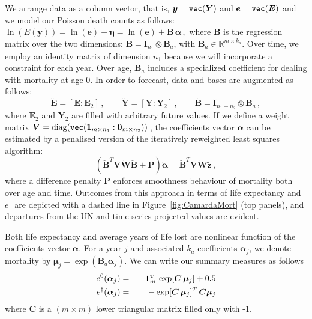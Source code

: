 \documentclass[twoside]{report}
\begin{document}
We arrange data as a column vector, that is, $\bm{y} = \verb"vec"(\bm{Y})$ and $\bm{e} = \verb"vec"(\bm{E})$ and we model our Poisson death counts as follows: $\ln(E(\bm{y})) = \ln(\bm{e})+ \bm{\eta} = \ln(\bm{e})+ \bm{B}\,\bm{\alpha}\, , $ where $\bm{B}$ is the regression matrix over the two dimensions: $\bm{B} = \bm{I}_{n_{1}} \otimes \bm{B}_{a}$, with $\bm{B}_{a} \in \mathbb{R}^{m \times k_{a}}$. Over time, we employ an identity matrix of dimension $n_{1}$ because we will incorporate a constraint for each year. Over age, $\bm{B}_{a}$ includes a specialized coefficient for dealing with mortality at age 0. In order to forecast, data and bases are augmented as follows:
\begin{equation}\label{eq:AugData}
\breve{\bm{E}} = [\bm{E} : \bm{E}_{2}]\, , \qquad 
\breve{\bm{Y}} = [\bm{Y} : \bm{Y}_{2}]\, , \qquad
\breve{\bm{B}} = \bm{I}_{n_{1}+n_{2}} \otimes \bm{B}_{a}
\, ,
\end{equation}
where $\bm{E}_{2}$ and $\bm{Y}_{2}$ are filled with arbitrary future values. If we define a weight matrix $\bm{V} = \mathrm{diag}(\verb"vec"(\bm{1}_{m\times n_{1}}:\bm{0}_{m\times n_{2}}))\,$, the coefficients vector $\bm{\alpha}$
can be estimated by a penalised version of the iteratively reweighted least squares algorithm: 
\begin{equation}\label{eq:penIRWLSfor}
(\breve{\bm{B}}^{T} \bm{V} \tilde{\bm{W}} \breve{\bm{B}} + \bm{P}) \tilde{\bm{\alpha}} =
\breve{\bm{B}}^{T}\bm{V} \tilde{\bm{W}}\tilde{\bm{z}} \, ,
\end{equation} 	
where a difference penalty $\bm{P}$ enforces smoothness behaviour of mortality both over age and time. Outcomes from this approach in terms of life expectancy and $e^{\dagger}$ are depicted with a dashed line in Figure~\ref{fig:CamardaMort} (top panels), and departures from the UN and time-series projected values are evident. 

Both life expectancy and average years of life lost are nonlinear function of the coefficients vector $\bm{\alpha}$. For a year $j$ and associated $k_{a}$ coefficients $\bm{\alpha}_{j}$, we denote mortality by $\bm{\mu}_{j} = \exp(\bm{B}_{a}\bm{\alpha}_{j})$. We can write our summary measures as follows
\begin{eqnarray}\label{eq:e0ed}
e^{0} (\bm{\alpha}_{j}) &=& \;\;\,\,\bm{1}_{m}^{\T} \, \exp[ \bm{C} \, \bm{\mu}_{j}]  + 0.5 \\
e^{\dagger} (\bm{\alpha}_{j}) &=&  - \exp[ \bm{C} \, \bm{\mu}_{j}]^{T} \, \bm{C} \bm{\mu}_{j} \nonumber
\end{eqnarray} 
where $\bm{C}$ is a $(m \times m)$ lower triangular matrix filled only with -1. 
\end{document}
